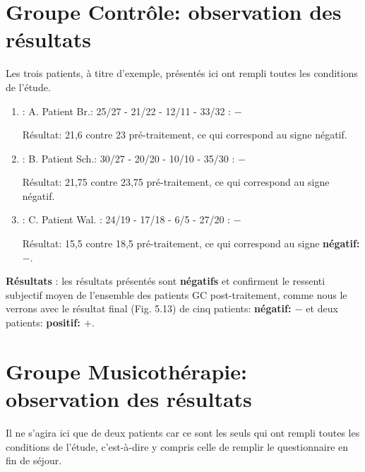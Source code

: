    \section*{Groupe Contrôle: observation des résultats }
   Les trois patients, à titre d'exemple,  présentés  ici ont rempli toutes les conditions de l'étude.
   \begin{enumerate}
   	\item : A. Patient Br.:  25/27 - 21/22 - 12/11 - 33/32 : $-$
   	
   	Résultat: 21,6 contre 23 pré-traitement,  ce qui
   	correspond au signe négatif.
   	\item : B. Patient Sch.: 30/27 - 20/20 -  10/10 - 35/30 :  $-$
   	
   	Résultat: 21,75 contre 23,75 pré-traitement, ce qui
   	correspond au signe négatif.
   	
   	\item :  C. Patient Wal. : 24/19 -  17/18 - 6/5 -
   	27/20 :   $-$
   	
   	Résultat: 15,5 contre 18,5 pré-traitement, ce qui
   	correspond au signe \textbf{négatif:  $-$}.
   \end{enumerate}
   
   
   \textbf{ Résultats }: les résultats présentés sont  \textbf{négatifs} 
   et confirment le ressenti subjectif moyen de l'ensemble des patients
   GC post-traitement,  comme nous le verrons avec  le résultat final  (Fig. 5.13) de
   cinq patients:  \textbf{négatif:  $-$} et deux patients:  \textbf{positif:  $+$}.
   
 \section*{Groupe Musicothérapie: observation des résultats}
 Il ne s'agira ici que de  deux patients car ce sont les seuls qui ont rempli toutes les conditions de l'étude, 
 c'est-à-dire y compris celle de remplir le questionnaire en fin de séjour.
 
